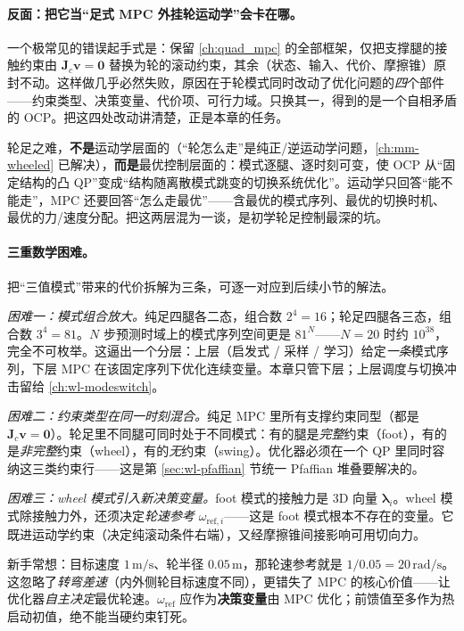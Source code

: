 \paragraph{反面：把它当“足式 MPC 外挂轮运动学”会卡在哪。}
一个极常见的错误起手式是：保留 \cref{ch:quad_mpc} 的全部框架，仅把支撑腿的接触约束由 $\mathbf{J}_c\mathbf{v}=\mathbf{0}$ 替换为轮的滚动约束，其余（状态、输入、代价、摩擦锥）原封不动。这样做几乎必然失败，原因在于轮模式同时改动了优化问题的\emph{四}个部件——约束类型、决策变量、代价项、可行力域。只换其一，得到的是一个自相矛盾的 OCP。把这四处改动讲清楚，正是本章的任务。

\begin{insight}
轮足之难，\textbf{不是}运动学层面的（“轮怎么走”是纯正/逆运动学问题，\cref{ch:mm-wheeled} 已解决），\textbf{而是}最优控制层面的：模式逐腿、逐时刻可变，使 OCP 从“固定结构的凸 QP”变成“结构随离散模式跳变的切换系统优化”。运动学只回答“能不能走”，MPC 还要回答“怎么走最优”——含最优的模式序列、最优的切换时机、最优的力/速度分配。把这两层混为一谈，是初学轮足控制最深的坑。
\end{insight}

\paragraph{三重数学困难。}
把“三值模式”带来的代价拆解为三条，可逐一对应到后续小节的解法。

\emph{困难一：模式组合放大。}\;纯足四腿各二态，组合数 $2^4=16$；轮足四腿各三态，组合数 $3^4=81$。$N$ 步预测时域上的模式序列空间更是 $81^N$——$N=20$ 时约 $10^{38}$，完全不可枚举。这逼出一个分层：上层（启发式 / 采样 / 学习）给定\emph{一条}模式序列，下层 MPC 在该固定序列下优化连续变量。本章只管下层；上层调度与切换冲击留给 \cref{ch:wl-modeswitch}。

\emph{困难二：约束类型在同一时刻混合。}\;纯足 MPC 里所有支撑约束同型（都是 $\mathbf{J}_c\mathbf{v}=\mathbf{0}$）。轮足里不同腿可同时处于不同模式：有的腿是\emph{完整}约束（foot），有的是\emph{非完整}约束（wheel），有的\emph{无}约束（swing）。优化器必须在一个 QP 里同时容纳这三类约束行——这是第 \ref{sec:wl-pfaffian} 节统一 Pfaffian 堆叠要解决的。

\emph{困难三：wheel 模式引入新决策变量。}\;foot 模式的接触力是 $3$D 向量 $\boldsymbol\lambda_i$。wheel 模式除接触力外，还须决定\emph{轮速参考} $\omega_{\mathrm{ref},i}$——这是 foot 模式根本不存在的变量。它既进运动学约束（决定纯滚动条件右端），又经摩擦锥间接影响可用切向力。

\begin{pitfall}
新手常想：目标速度 $1\,\mathrm{m/s}$、轮半径 $0.05\,\mathrm{m}$，那轮速参考就是 $1/0.05=20\,\mathrm{rad/s}$。这忽略了\emph{转弯差速}（内外侧轮目标速度不同），更错失了 MPC 的核心价值——让优化器\emph{自主决定}最优轮速。$\omega_{\mathrm{ref}}$ 应作为\textbf{决策变量}由 MPC 优化；前馈值至多作为热启动初值，绝不能当硬约束钉死。
\end{pitfall}

